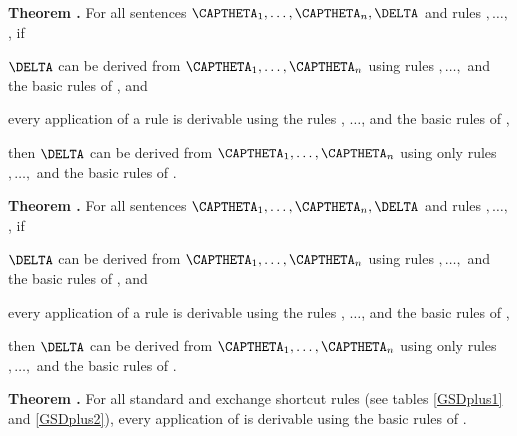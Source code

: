 \begin{majorILnc}{\textbf{Theorem .}}
For all \GSL{} sentences $\CAPTHETA_1,\ldots,\CAPTHETA_{\integer{n}},\DELTA$ and rules $,\ldots,$, if
\begin{cenumerate}
\item $\DELTA$ can be derived from $\CAPTHETA_1,\ldots,\CAPTHETA_{\integer{n}}$ using rules $,\ldots,$ and the basic rules of \GSD{}, and
\item every application of a rule  is derivable using the rules , $\ldots$,  and the basic rules of \GSD{},
\end{cenumerate}
then $\DELTA$ can be derived from $\CAPTHETA_1,\ldots,\CAPTHETA_{\integer{n}}$ using only rules $,\ldots,$ and the basic rules of \GSD{}.
\end{majorILnc}

\begin{majorILnc}{\textbf{Theorem .}}
For all \GQL{} sentences $\CAPTHETA_1,\ldots,\CAPTHETA_{\integer{n}},\DELTA$ and rules $,\ldots,$, if
\begin{cenumerate}
\item $\DELTA$ can be derived from $\CAPTHETA_1,\ldots,\CAPTHETA_{\integer{n}}$ using rules $,\ldots,$ and the basic rules of \GSD{}, and
\item every application of a rule  is derivable using the rules , $\ldots$,  and the basic rules of \GQD{},
\end{cenumerate}
then $\DELTA$ can be derived from $\CAPTHETA_1,\ldots,\CAPTHETA_{\integer{n}}$ using only rules $,\ldots,$ and the basic rules of \GQD{}.
\end{majorILnc}

\begin{majorILnc}{\textbf{Theorem .}}
For all standard and exchange shortcut rules  (see tables \ref{GSDplus1} and \ref{GSDplus2}), every application of  is derivable using the basic rules of \GSD{}.
\end{majorILnc}

